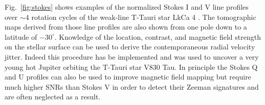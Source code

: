 Fig.~\ref{fig:stokes} 
shows examples of the normalized Stokes I and V line profiles over $\sim 4$ rotation 
cycles of the weak-line T-Tauri star LkCa 4 \parencite{donati14b}. The tomographic maps derived 
from those line profiles are also shown from one pole down to a latitude of $-30^{\circ}$. 
Knowledge of the location, contrast, and magnetic field strength on the stellar surface can 
be used to derive the contemporaneous radial velocity jitter. Indeed this procedure has be 
implemented and was used to uncover a very young hot Jupiter orbiting the T-Tauri star 
V830 Tau. In principle the Stokes Q and U profiles 
can also be used to improve magnetic field mapping but require much higher SNRs 
than Stokes V in order to detect their Zeeman signatures and are often neglected as a result. \\


